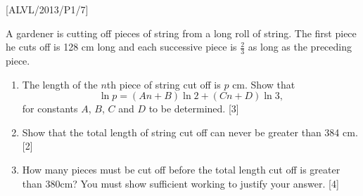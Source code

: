 \item {[}ALVL/2013/P1/7{]}

A gardener is cutting off pieces of string from a long roll of string.
The first piece he cuts off is 128 cm long and each successive piece
is $\frac{2}{3}$ as long as the preceding piece. 
\begin{enumerate}
\item The length of the $n$th piece of string cut off is $p$ cm. Show
that 
\[
\ln p=\left(An+B\right)\ln2+(Cn+D)\ln3,
\]
for constants $A$, $B$, $C$ and $D$ to be determined. \hfill{}{[}3{]}
\item Show that the total length of string cut off can never be greater
than 384 cm. \hfill{} {[}2{]}
\item How many pieces must be cut off before the total length cut off is
greater than 380cm? You must show sufficient working to justify your
answer. \hfill{}{[}4{]}
\end{enumerate}
